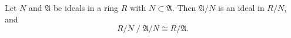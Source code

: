 Let $N$ and $\mathfrak{A}$ be ideals in a ring $R$ with $N \subset \mathfrak{A}$. Then $\mathfrak{A}/N$ is an ideal in $R/N$, and
$$R/N \; \big/ \; \mathfrak{A}/N \cong R/\mathfrak{A}.$$
